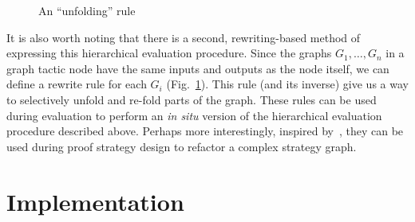 \documentclass{llncs}
\begin{document}
\begin{figure}\centering
  \vspace{-12pt}
  \vspace{-2pt}
  \caption{An ``unfolding'' rule}\label{fig:unfold-or}
  \vspace{-14pt}
\end{figure}

It is also worth noting that there is a second, rewriting-based method of expressing this hierarchical evaluation procedure. Since the graphs $G_1, \ldots, G_n$ in a graph tactic node have the same inputs and outputs as the node itself, we can define a rewrite rule for each $G_i$ (Fig.~\ref{fig:unfold-or}). This rule (and its inverse) give us a way to selectively unfold and re-fold parts of the graph. These rules can be used during evaluation to perform an \textit{in situ} version of the hierarchical evaluation procedure described above. Perhaps more interestingly, inspired by~\cite{paper:Whiteside:11}, they can be used during proof strategy design to refactor a complex strategy graph.


\beforesection
\section{Implementation}\label{sec:impl}
\aftersection

\newcommand{\psgraphtool}{\textsf{PSGraph}}
\end{document}

